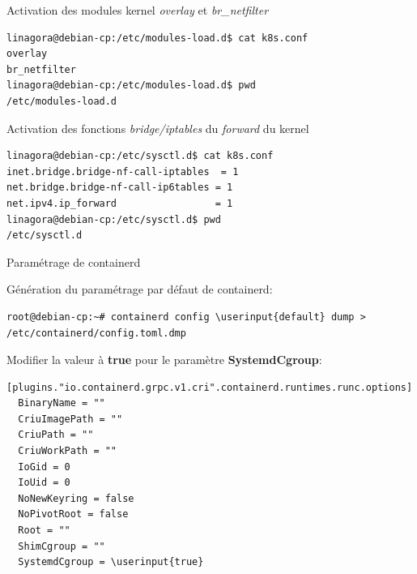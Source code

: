
\begin{frame}[fragile]{Activation des modules kernel \textit{overlay} et \textit{br\_netfilter}}

\begin{tiny}
\begin{Verbatim}[commandchars=\&\#\#]
linagora@debian-cp:/etc/modules-load.d$ cat k8s.conf 
overlay
br_netfilter
linagora@debian-cp:/etc/modules-load.d$ pwd
/etc/modules-load.d
\end{Verbatim}
\end{tiny}

\end{frame}


\begin{frame}[fragile]{Activation des fonctions \textit{bridge/iptables} du \textit{forward} du kernel}

\begin{tiny}
\begin{Verbatim}[commandchars=\&\#\#]
linagora@debian-cp:/etc/sysctl.d$ cat k8s.conf 
inet.bridge.bridge-nf-call-iptables  = 1
net.bridge.bridge-nf-call-ip6tables = 1
net.ipv4.ip_forward                 = 1
linagora@debian-cp:/etc/sysctl.d$ pwd
/etc/sysctl.d
\end{Verbatim}
\end{tiny}

\end{frame}


\begin{frame}[fragile]{Paramétrage de containerd}

Génération du paramétrage par défaut de containerd:

\begin{tiny}
\begin{Verbatim}[commandchars=\\\{\}]
root@debian-cp:~# containerd config \userinput{default} dump > /etc/containerd/config.toml.dmp
\end{Verbatim}
\end{tiny}

Modifier la valeur à \textbf{true} pour le paramètre \textbf{SystemdCgroup}:

\begin{tiny}
\begin{Verbatim}[commandchars=\\\{\}]
[plugins."io.containerd.grpc.v1.cri".containerd.runtimes.runc.options]
  BinaryName = ""
  CriuImagePath = ""
  CriuPath = ""
  CriuWorkPath = ""
  IoGid = 0
  IoUid = 0
  NoNewKeyring = false
  NoPivotRoot = false
  Root = ""
  ShimCgroup = ""
  SystemdCgroup = \userinput{true}
\end{Verbatim}
\end{tiny}

\end{frame}

